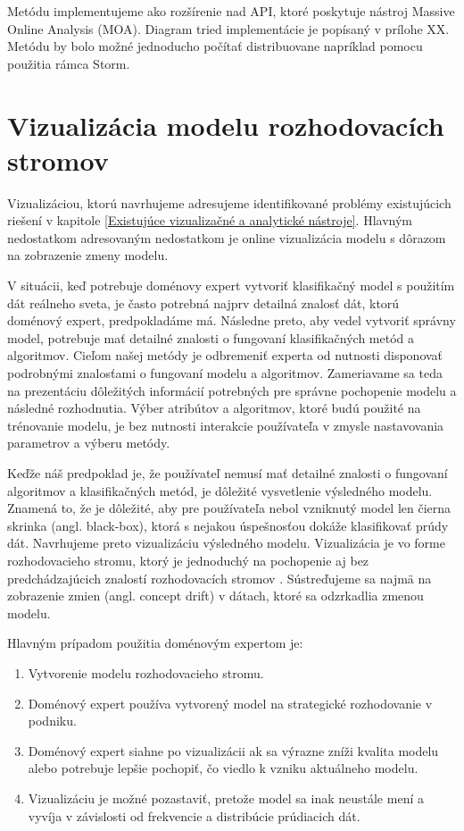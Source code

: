 \par
Metódu implementujeme ako rozšírenie nad API, ktoré poskytuje nástroj Massive Online Analysis (MOA). Diagram tried implementácie je popísaný v prílohe XX.%
  Metódu by bolo možné jednoducho počítať distribuovane napríklad pomocu použitia rámca Storm.


\chapter{Vizualizácia modelu rozhodovacích stromov}
\label{my-method-prezentacia-vysledkov}
Vizualizáciou, ktorú navrhujeme adresujeme identifikované problémy existujúcich riešení v kapitole \ref{Existujúce vizualizačné a analytické nástroje}. Hlavným nedostatkom adresovaným nedostatkom je online vizualizácia modelu s dôrazom na zobrazenie zmeny modelu.
\par
V situácii, keď potrebuje doménovy expert vytvoriť klasifikačný model s použitím dát reálneho sveta, je často potrebná najprv detailná znalosť dát, ktorú doménový expert, predpokladáme má.  Následne preto, aby vedel vytvoriť správny model, potrebuje mať detailné znalosti o fungovaní klasifikačných metód a algoritmov. Cieľom našej metódy je odbremeniť experta od nutnosti disponovať podrobnými znalosťami o fungovaní modelu a algoritmov. Zameriavame sa teda na prezentáciu dôležitých informácií potrebných pre správne pochopenie modelu a následné rozhodnutia. Výber atribútov a algoritmov, ktoré budú použité na trénovanie modelu, je bez nutnosti interakcie používateľa v zmysle nastavovania parametrov a výberu metódy. 
\par
Keďže náš predpoklad je, že používateľ nemusí mať detailné znalosti o fungovaní algoritmov a klasifikačných metód, je dôležité vysvetlenie výsledného modelu. Znamená to, že je dôležité, aby pre používateľa nebol vzniknutý model len čierna skrinka (angl. black-box), ktorá s nejakou úspešnosťou dokáže klasifikovať prúdy dát. Navrhujeme preto vizualizáciu výsledného modelu. Vizualizácia je vo forme rozhodovacieho stromu, ktorý je jednoduchý na pochopenie aj bez predchádzajúcich znalostí rozhodovacích stromov \citep{nguyen2015survey}. Sústreďujeme sa najmä na zobrazenie zmien (angl. concept drift) v dátach, ktoré sa odzrkadlia zmenou modelu.
\par
Hlavným prípadom použitia doménovým expertom je:
\begin{enumerate}
	\item Vytvorenie modelu rozhodovacieho stromu.
	\item Doménový expert používa vytvorený model na strategické rozhodovanie v podniku.
	\item Doménový expert siahne po vizualizácii ak sa výrazne zníži kvalita modelu alebo potrebuje lepšie pochopiť, čo viedlo k vzniku aktuálneho modelu.
	\item Vizualizáciu je možné pozastaviť, pretože model sa inak neustále mení a vyvíja v závislosti od frekvencie a distribúcie prúdiacich dát.
\end{enumerate}

